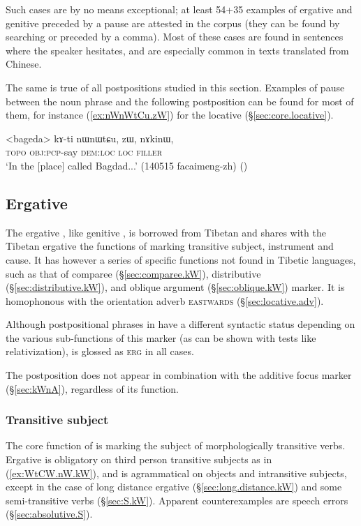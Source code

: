 Such cases are by no means exceptional; at least 54+35 examples of ergative and genitive preceded by a pause are attested in the corpus (they can be found by searching  or   preceded by a comma). Most of these cases are found in sentences where the speaker hesitates, and are especially common in texts translated from Chinese.

The same is true of all postpositions studied in this section. Examples of pause between the noun phrase and the following postposition can be found for most of them, for instance (\ref{ex:nWnWtCu.zW}) for the locative  (§\ref{sec:core.locative}).

\begin{exe}
\ex \label{ex:nWnWtCu.zW}
\gll  <bageda> kɤ-ti nɯnɯtɕu, zɯ, nɤkinɯ, \\
\textsc{topo} \textsc{obj}:\textsc{pcp}-say \textsc{dem}:\textsc{loc} \textsc{loc} \textsc{filler} \\
\glt `In the [place] called Bagdad...' (140515 facaimeng-zh) ()
\end{exe}

\subsection{Ergative} \label{sec:erg.kW}
The ergative , like genitive , is borrowed from Tibetan \citep{jacques16comparative} and shares with the Tibetan ergative the functions of marking transitive subject, instrument and cause. It has however a series of specific functions not found in Tibetic languages, such as that of comparee (§\ref{sec:comparee.kW}), distributive (§\ref{sec:distributive.kW}),  and oblique argument (§\ref{sec:oblique.kW}) marker. It is homophonous with the orientation adverb  \textsc{eastwards} (§\ref{sec:locative.adv}).

Although postpositional phrases in  have a different syntactic status depending on the various sub-functions of this marker (as can be shown with tests like relativization),  is glossed as \textsc{erg} in all cases.

The postposition  does not appear in combination with the additive focus marker  (§\ref{sec:kWnA}), regardless of its function.

\subsubsection{Transitive subject} \label{sec:A.kW}
The core function of  is marking the subject of morphologically transitive verbs. Ergative is obligatory on third person transitive subjects as in (\ref{ex:WtCW.nW.kW}), and is agrammatical on objects and intransitive subjects, except in the case of long distance ergative (§\ref{sec:long.distance.kW}) and some semi-transitive verbs (§\ref{sec:S.kW}). Apparent counterexamples are speech errors (§\ref{sec:absolutive.S}).


